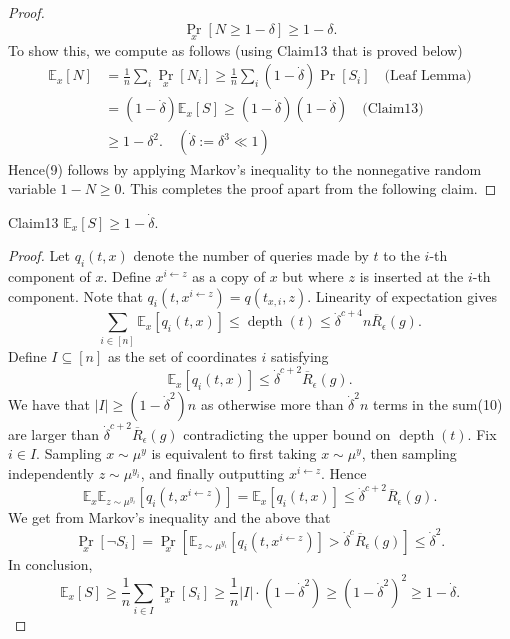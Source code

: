 \begin{proof}
\begin{equation}\tag{9}\Pr_x[N\ge1-\delta]\ge1-\delta.\end{equation}
To show this, we compute as follows (using Claim13 that is proved below)
\begin{align*}
\mathbb E_x[N]&=\frac1n\sum_i\Pr_x[N_i]\ge\frac1n\sum_i(1-\dot\delta)\Pr[S_i]\quad\text{(Leaf Lemma)}\\
&=(1-\dot\delta)\mathbb E_x[S]\ge(1-\dot\delta)(1-\dot\delta)\quad\text{(Claim13)}\\
&\ge1-\delta^2.\quad(\dot\delta:=\delta^3\ll1)
\end{align*}
Hence(9) follows by applying Markov's inequality to the nonnegative random variable $1-N\ge0$. This completes the proof apart from the following claim.
\end{proof}
\begin{authorclaim}{Claim13}
$\mathbb E_x[S]\ge1-\dot\delta$.
\end{authorclaim}
\begin{proof}
Let $q_i(t,x)$ denote the number of queries made by $t$ to the $i$-th component of $x$. Define $x^{i\leftarrow z}$ as a copy of $x$ but where $z$ is inserted at the $i$-th component. Note that $q_i(t,x^{i\leftarrow z})=q(t_{x,i},z)$. Linearity of expectation gives
\begin{equation}\tag{10}\sum_{i\in[n]}\mathbb E_x[q_i(t,x)]\le\operatorname{depth}(t)\le\dot\delta^{c+4}n\overline R_\epsilon(g).\end{equation}
Define $I\subseteq[n]$ as the set of coordinates $i$ satisfying
\begin{equation}\tag{11}\mathbb E_x[q_i(t,x)]\le\dot\delta^{c+2}\overline R_\epsilon(g).\end{equation}
We have that $|I|\ge(1-\dot\delta^2)n$ as otherwise more than $\dot\delta^2n$ terms in the sum(10) are larger than $\dot\delta^{c+2}\overline R_\epsilon(g)$ contradicting the upper bound on $\operatorname{depth}(t)$. Fix $i\in I$. Sampling $x\sim\mu^y$ is equivalent to first taking $x\sim\mu^y$, then sampling independently $z\sim\mu^{y_i}$, and finally outputting $x^{i\leftarrow z}$. Hence
\[\mathbb E_x\mathbb E_{z\sim\mu^{y_i}}[q_i(t,x^{i\leftarrow z})]=\mathbb E_x[q_i(t,x)]\le\dot\delta^{c+2}\overline R_\epsilon(g).\]
We get from Markov's inequality and the above that
\begin{equation}\tag{12}\Pr_x[\neg S_i]=\Pr_x\left[\mathbb E_{z\sim\mu^{y_i}}[q_i(t,x^{i\leftarrow z})]>\dot\delta^c\overline R_\epsilon(g)\right]\le\dot\delta^2.\end{equation}
In conclusion,
\[\mathbb E_x[S]\ge\frac1n\sum_{i\in I}\Pr_x[S_i]\ge\frac1n|I|\cdot(1-\dot\delta^2)\ge(1-\dot\delta^2)^2\ge1-\dot\delta.\]
\end{proof}
